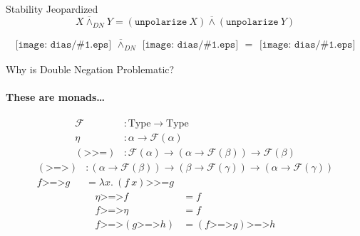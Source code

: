 \documentclass{beamer}
\newcommand{\dand}{\mathbin{\overline{\land}}}
\newcommand{\hsbind}{\mathbin{\texttt{>>=}}}
\newcommand{\kleislicomp}{\mathbin{\texttt{>=>}}}
\newcommand{\includepicturescale}[2]{
    \texttt{[image: dias/\#1.eps]}
}
\begin{document}
\begin{frame}{Stability Jeopardized}
  $$X \dand_{DN} Y = (\texttt{unpolarize}\ X) \dand (\texttt{unpolarize}\ Y)$$ 
  \vfill
  \begin{adjustbox}{center}
  $$\begin{array}{l}\includepicturescale{double_negation}{0.33}\end{array} \dand_{DN} \begin{array}{l}\includepicturescale{A}{0.33}\end{array} = \begin{array}{l}\includepicturescale{negation}{0.33}\end{array}$$
  \end{adjustbox}
\end{frame}

\begin{frame}{Why is Double Negation Problematic?}
  \framesubtitle{These are monads\ldots}

  \begin{align*}
    \mathcal{F} &: \text{Type} \to \text{Type} \\
    \eta &: \alpha \to \mathcal{F}(\alpha) \\
    (\hsbind) &: \mathcal{F}(\alpha) \to (\alpha \to \mathcal{F}(\beta)) \to \mathcal{F}(\beta)
  \end{align*}
  \vfill
  \pause
  \begin{align*}
    (\kleislicomp) &: (\alpha \to \mathcal{F}(\beta)) \to (\beta \to \mathcal{F}(\gamma)) \to (\alpha \to \mathcal{F}(\gamma)) \\
    f \kleislicomp g &= \lambda x.\ (f\ x) \hsbind g
  \end{align*}
  \vfill
  \pause
  \begin{align*}
    \eta \kleislicomp f &= f \\
    f \kleislicomp \eta &= f \\
    f \kleislicomp (g \kleislicomp h) &= (f \kleislicomp g) \kleislicomp h
  \end{align*}
\end{frame}
\end{document}
